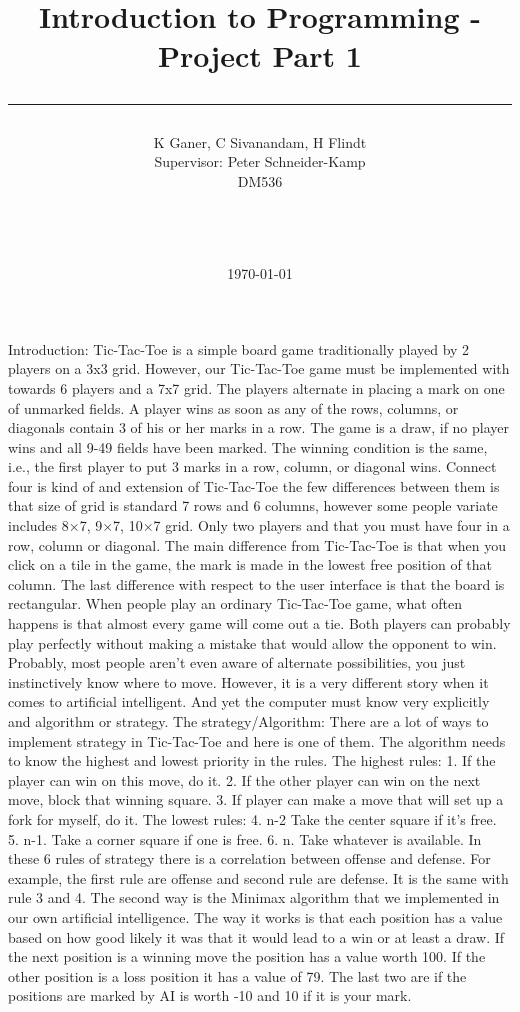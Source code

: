 \documentclass[a4paper,10pt]{article}
\title{Introduction to Programming - Project Part 1 \\\rule{10cm}{0.5mm}}
\author{K Ganer, C Sivanandam, H Flindt 
	\\Supervisor: Peter Schneider-Kamp\\ DM536\\\rule{5.5cm}{0.5mm}\\}
\date{\today}
\begin{document}
	
	\maketitle
	
	\vfill
	
	\tableofcontents
	
	\newpage
	
	Introduction:
Tic-Tac-Toe is a simple board game traditionally played by 2 players on a 3x3 grid. However, our Tic-Tac-Toe game must be implemented with towards 6 players and a 7x7 grid. The players alternate in placing a mark on one of unmarked fields. A player wins as soon as any of the rows, columns, or diagonals contain 3 of his or her marks in a row. The game is a draw, if no player wins and all 9-49 fields have been marked. The winning condition is the same, i.e., the first player to put 3 marks in a row, column, or diagonal wins. 
Connect four is kind of and extension of Tic-Tac-Toe the few differences between them is that size of grid is standard 7 rows and 6 columns, however some people variate includes 8×7, 9×7, 10×7 grid. Only two players and that you must have four in a row, column or diagonal. The main difference from Tic-Tac-Toe is that when you click on a tile in the game, the mark is made in the lowest free position of that column. The last difference with respect to the user interface is that the board is rectangular.
When people play an ordinary Tic-Tac-Toe game, what often happens is that almost every game will come out a tie. Both players can probably play perfectly without making a mistake that would allow the opponent to win. Probably, most people aren’t even aware of alternate possibilities, you just instinctively know where to move. However, it is a very different story when it comes to artificial intelligent. And yet the computer must know very explicitly and algorithm or strategy. 
The strategy/Algorithm:
There are a lot of ways to implement strategy in Tic-Tac-Toe and here is one of them. The algorithm needs to know the highest and lowest priority in the rules. 
The highest rules:
1. If the player can win on this move, do it. 
2. If the other player can win on the next move, block that winning square.
3. If player can make a move that will set up a fork for myself, do it.
The lowest rules:
4. n-2 Take the center square if it’s free.
5. n-1. Take a corner square if one is free. 
6. n. Take whatever is available.
In these 6 rules of strategy there is a correlation between offense and defense. For example, the first rule are offense and second rule are defense. It is the same with rule 3 and 4. 
The second way is the Minimax algorithm that we implemented in our own artificial intelligence. The way it works is that each position has a value based on how good likely it was that it would lead to a win or at least a draw. If the next position is a winning move the position has a value worth 100. If the other position is a loss position it has a value of 79. The last two are if the positions are marked by AI is worth -10 and 10 if it is your mark. 
\end{document}
